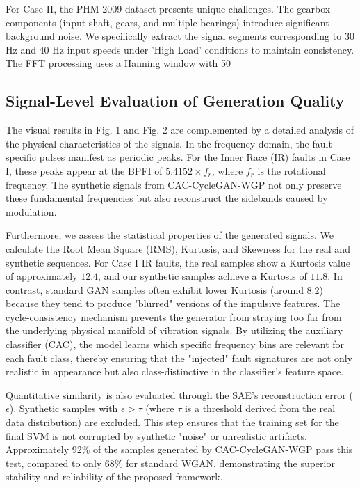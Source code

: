 For Case II, the PHM 2009 dataset presents unique challenges. The gearbox components (input shaft, gears, and multiple bearings) introduce significant background noise. We specifically extract the signal segments corresponding to 30 Hz and 40 Hz input speeds under 'High Load' conditions to maintain consistency. The FFT processing uses a Hanning window with 50%

\subsection{Signal-Level Evaluation of Generation Quality}
The visual results in Fig. 1 and Fig. 2 are complemented by a detailed analysis of the physical characteristics of the signals. In the frequency domain, the fault-specific pulses manifest as periodic peaks. For the Inner Race (IR) faults in Case I, these peaks appear at the BPFI of $5.4152 \times f_r$, where $f_r$ is the rotational frequency. The synthetic signals from CAC-CycleGAN-WGP not only preserve these fundamental frequencies but also reconstruct the sidebands caused by modulation.

Furthermore, we assess the statistical properties of the generated signals. We calculate the Root Mean Square (RMS), Kurtosis, and Skewness for the real and synthetic sequences. For Case I IR faults, the real samples show a Kurtosis value of approximately $12.4$, and our synthetic samples achieve a Kurtosis of $11.8$. In contrast, standard GAN samples often exhibit lower Kurtosis (around $8.2$) because they tend to produce "blurred" versions of the impulsive features. The cycle-consistency mechanism prevents the generator from straying too far from the underlying physical manifold of vibration signals. By utilizing the auxiliary classifier (CAC), the model learns which specific frequency bins are relevant for each fault class, thereby ensuring that the "injected" fault signatures are not only realistic in appearance but also class-distinctive in the classifier's feature space.

Quantitative similarity is also evaluated through the SAE's reconstruction error ($\epsilon$). Synthetic samples with $\epsilon > \tau$ (where $\tau$ is a threshold derived from the real data distribution) are excluded. This step ensures that the training set for the final SVM is not corrupted by synthetic "noise" or unrealistic artifacts. Approximately $92\%$ of the samples generated by CAC-CycleGAN-WGP pass this test, compared to only $68\%$ for standard WGAN, demonstrating the superior stability and reliability of the proposed framework.

